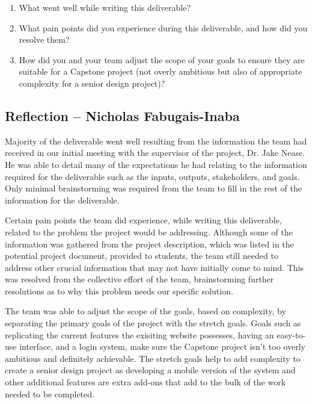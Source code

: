 \documentclass{article}
\begin{document}



\begin{enumerate}
    \item What went well while writing this deliverable? 
    \item What pain points did you experience during this deliverable, and how
    did you resolve them?
    \item How did you and your team adjust the scope of your goals to ensure
    they are suitable for a Capstone project (not overly ambitious but also of
    appropriate complexity for a senior design project)?
\end{enumerate}  

\subsection*{Reflection -- Nicholas Fabugais-Inaba}

Majority of the deliverable went well resulting from the information
the team had received in our initial meeting with the supervisor of the
project, Dr. Jake Nease. He was able to detail many of the expectations
he had relating to the information required for the deliverable such as
the inputs, outputs, stakeholders, and goals. Only minimal brainstorming
was required from the team to fill in the rest of the information for the
deliverable. \newline

Certain pain points the team did experience, while writing this deliverable,
related to the problem the project would be addressing. Although some of
the information was gathered from the project description, which was listed
in the potential project document, provided to students, the team
still needed to address other crucial information that may not have
initially come to mind. This was resolved from the collective effort of
the team, brainstorming further resolutions as to why this problem needs
our specific solution. \newline

The team was able to adjust the scope of the goals, based on complexity,
by separating the primary goals of the project with the stretch goals.
Goals such as replicating the current features the exisiting website
possesses, having an easy-to-use interface, and a login system, make sure
the Capstone project isn't too overly ambitious and definitely achievable.
The stretch goals help to add complexity to create a senior design project
as developing a mobile version of the system and other additional features
are extra add-ons that add to the bulk of the work needed to be completed.
\end{document}
